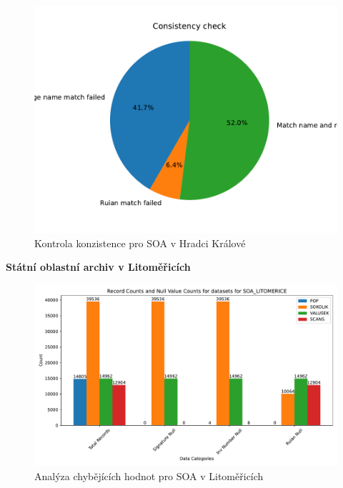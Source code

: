 \begin{figure}[htbp]
\centering
    \includegraphics[scale=.5]{obrazky-figures/dataAnalysis/soaHradecKralove/consistencyCheck2.pdf}
    \caption{Kontrola konzistence pro SOA v Hradci Králové}
\end{figure}

\newpage
\noindent\textbf{Státní oblastní archiv v Litoměřicích}\\

\begin{figure}[htbp]
\centering
    \includegraphics[scale=.5]{obrazky-figures/dataAnalysis/soaLitomerice/missingValues.pdf}
    \caption{Analýza chybějících hodnot pro SOA v Litoměřicích}
\end{figure}

